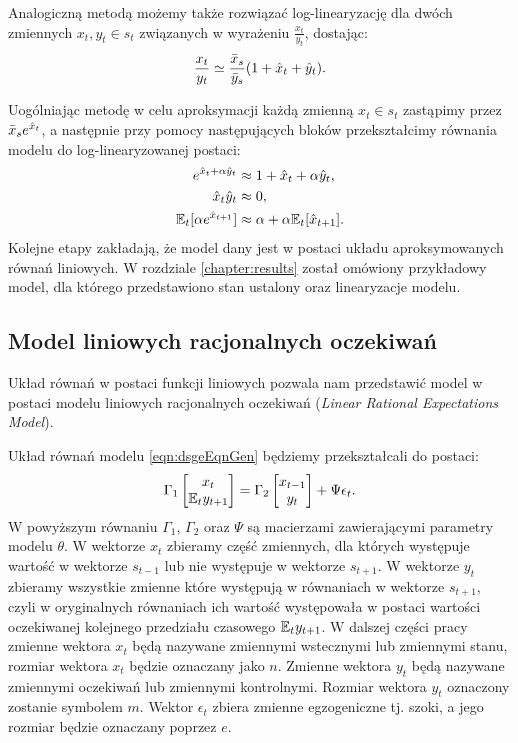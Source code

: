 Analogiczną metodą możemy także rozwiązać log-linearyzację dla dwóch zmiennych $x_t,y_t \in s_t$ związanych w wyrażeniu $\frac{x_t}{y_t}$, dostając:
\begin{equation}
    \frac{x_t}{y_t} \simeq \frac{\bar{x}_s}{\bar{y}_s}(1 + \hat{x}_t + \hat{y}_t).
\end{equation}

Uogólniając metodę w celu aproksymacji każdą zmienną $x_t \in s_t$ zastąpimy przez $\bar{x}_se^{\hat{x}_t}$, a następnie przy pomocy następujących bloków przekształcimy równania modelu do log-linearyzowanej postaci:
\begin{align}
    e^{\hat{x}_t + \alpha \hat{y}_t} &\approx 1 + \hat{x}_t + \alpha \hat{y}_t, \\
    \hat{x}_t \hat{y}_t &\approx 0, \\
    \mathbb{E}_t[\alpha e^{\hat{x}_{t+1}}] &\approx \alpha +  \alpha \mathbb{E}_t[ \hat{x}_{t+1}].
\end{align}
Kolejne etapy zakładają, że model dany jest w postaci układu aproksymowanych równań liniowych. W rozdziale \ref{chapter:results} został omówiony przykładowy model, dla którego przedstawiono stan ustalony oraz linearyzacje modelu.

\subsection{Model liniowych racjonalnych oczekiwań}

Układ równań w postaci funkcji liniowych pozwala nam przedstawić model w postaci modelu liniowych racjonalnych oczekiwań (\emph{Linear Rational Expectations Model}). 

Układ równań modelu \eqref{eqn:dsgeEqnGen} będziemy przekształcali do postaci:
\begin{equation}
    \label{eq:lre-model}
    \Gamma_1 
    \begin{bmatrix}
    x_{t} \\
    \mathbb{E}_t y_{t+1}
\end{bmatrix} = \Gamma_2 \begin{bmatrix}
    x_{t-1} \\
    y_{t}
\end{bmatrix} + \Psi \epsilon_t.
\end{equation}
W powyższym równaniu $\Gamma_1$, $\Gamma_2$ oraz $\Psi$ są macierzami zawierającymi parametry modelu $\theta$. W wektorze $x_{t}$ zbieramy część zmiennych, dla których występuje wartość w wektorze $s_{t-1}$ lub nie występuje w wektorze $s_{t+1}$. W wektorze $y_t$ zbieramy wszystkie zmienne które występują w równaniach w wektorze $s_{t+1}$, czyli w oryginalnych równaniach ich wartość występowała w postaci wartości oczekiwanej kolejnego przedziału czasowego $\mathbb{E}_t y_{t+1}$. W dalszej części pracy zmienne wektora $x_t$ będą nazywane zmiennymi wstecznymi lub zmiennymi stanu, rozmiar wektora $x_t$ będzie oznaczany jako $n$. Zmienne wektora $y_t$ będą nazywane zmiennymi oczekiwań lub zmiennymi kontrolnymi. Rozmiar wektora $y_t$ oznaczony zostanie symbolem  $m$. Wektor $\epsilon_t$ zbiera zmienne egzogeniczne tj. szoki, a jego rozmiar będzie oznaczany poprzez $e$.

